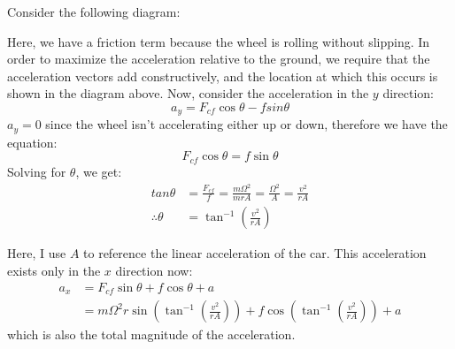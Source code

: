 \documentclass[10pt]{article}
\begin{document}
	\begin{solution}
		Consider the following diagram: 
		
		\begin{center}
		\end{center}

		Here, we have a friction term because the wheel is rolling without slipping. In order to maximize 
		the acceleration relative to the ground, we require that the acceleration vectors add constructively, 
		and the location at which this occurs is shown in the diagram above. Now, consider the acceleration in 
		the $y$ direction:
		\[
			a_y = F_{cf} \cos \theta - f sin \theta
		\] 
		$a_y = 0$ since the wheel isn't accelerating either up or down, therefore we have the equation: 
		\[
			F_{cf} \cos \theta = f \sin \theta
		\] 
		Solving for $\theta$, we get:
		\begin{align*}
			tan \theta &= \frac{F_{cf}}{f} = \frac{m\Omega^2}{mrA} = \frac{\Omega^2}{A} = \frac{v^2}{rA}\\
			\therefore \theta &= \tan^{-1}\left( \frac{v^2}{rA} \right) 
		\end{align*}

		Here, I use $A$ to reference the linear acceleration of the car. This acceleration exists only in the $
		x$ direction now:
		\begin{align*}
			a_x &= F_{cf} \sin \theta + f \cos \theta + a\\
				&= m\Omega^2 r \sin\left( \tan^{-1}\left( \frac{v^2}{rA} \right)  \right)  + f \cos \left( 
				\tan^{-1}\left( \frac{v^2}{rA} \right) \right) +a
		\end{align*}
		which is also the total magnitude of the acceleration.
	\end{solution}
\end{document}
